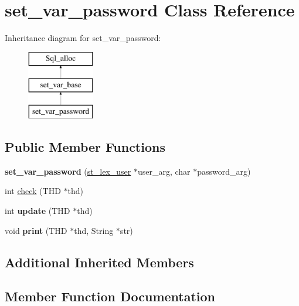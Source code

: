 \hypertarget{classset__var__password}{}\section{set\+\_\+var\+\_\+password Class Reference}
\label{classset__var__password}
Inheritance diagram for set\+\_\+var\+\_\+password\+:\begin{figure}[H]
\begin{center}
\leavevmode
\includegraphics[height=3.000000cm]{classset__var__password}
\end{center}
\end{figure}
\subsection*{Public Member Functions}
\begin{DoxyCompactItemize}
\item 
\mbox{\label{classset__var__password_a581afde4c059341604a3231d9af5436d}} 
{\bfseries set\+\_\+var\+\_\+password} (\mbox{\hyperlink{structst__lex__user}{st\+\_\+lex\+\_\+user}} $\ast$user\+\_\+arg, char $\ast$password\+\_\+arg)
\item 
int \mbox{\hyperlink{classset__var__password_a5d3db6ecee628f331eeeb99d8f63ad2a}{check}} (T\+HD $\ast$thd)
\item 
\mbox{\label{classset__var__password_aeb7083cfee4f184c73b0cc62e5738de7}} 
int {\bfseries update} (T\+HD $\ast$thd)
\item 
\mbox{\label{classset__var__password_a120c9a89ddeb04cf7d838a7a25c1d799}} 
void {\bfseries print} (T\+HD $\ast$thd, String $\ast$str)
\end{DoxyCompactItemize}
\subsection*{Additional Inherited Members}


\subsection{Member Function Documentation}
\mbox{\label{classset__var__password_a5d3db6ecee628f331eeeb99d8f63ad2a}} 
